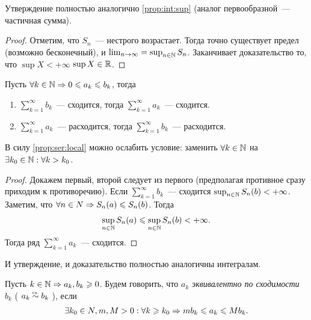 \documentclass[../main.tex]{subfiles}
\begin{document}
\begin{note}
  Утверждение полностью аналогично \ref{prop:int:sup} (аналог первообразной~--- частичная сумма). 
\end{note}


\begin{proof}
  Отметим, что $S_n$~--- нестрого возрастает. Тогда точно существует предел (возможно бесконечный), и $\lim_{n \to \infty} = \sup_{n \in \mathbb{N}} S_n$. Заканчивает доказательство то, что $\sup X < + \infty $ \nas $\sup X \in \mathbb{R}$.  
\end{proof}


\begin{proposition}
  Пусть $\forall k \in \mathbb{N} \Rightarrow 0 \leqslant a_k \leqslant b_k$, тогда 
  \begin{enumerate}
    \item $ \sum_{k=1}^{\infty} b_k  $~--- сходится, тогда $ \sum_{k=1}^{\infty} a_k $~---  сходится.
    \item $ \sum_{k=1}^{\infty} a_k $~---  расходится, тогда $ \sum_{k=1}^{\infty} b_k $~--- расходится.
  \end{enumerate} 
\end{proposition}


\begin{note}
    В силу \ref{prop:ser:local} можно ослабить условие: заменить $\forall k \in \mathbb{N}$ на $\exists k_0 \in \mathbb{N}: \forall k > k_0 $.
\end{note}


\begin{proof}
  Докажем первый, второй следует из первого (предполагая противное сразу приходим к противоречию). Если $ \sum_{k=1}^{\infty} b_k $~--- сходится \nas $\sup_{n\in\mathbb{N}} S_n(b) < +\infty$. Заметим, что $\forall n \in N \Rightarrow S_n(a) \leqslant S_n(b)$. Тогда 
  \begin{gather} 
    \sup_{n\in\mathbb{N}}S_n(a) \leqslant \sup_{n\in\mathbb{N}} S_n(b) < +\infty .
  \end{gather}  
  Тогда ряд $ \sum_{k=1}^{\infty} a_k $~---  сходится.
\end{proof}


\begin{note}
  И утверждение, и доказательство полностью аналогичны интегралам.
\end{note}


\begin{definition}
  Пусть $ k \in \mathbb{N} \Rightarrow a_k, b_k \geqslant 0$. Будем говорить, что $a_k $ \emph{эквивалентно по сходимости} $b_k $ ( $a_k \eqincon b_k $ ), если 
  \begin{gather} 
    \exists k_0 \in N, m, M > 0: \forall k \geqslant k_0 \Rightarrow mb_k \leqslant a_k \leqslant Mb_k  .
  \end{gather} 
\end{definition}
\end{document}
